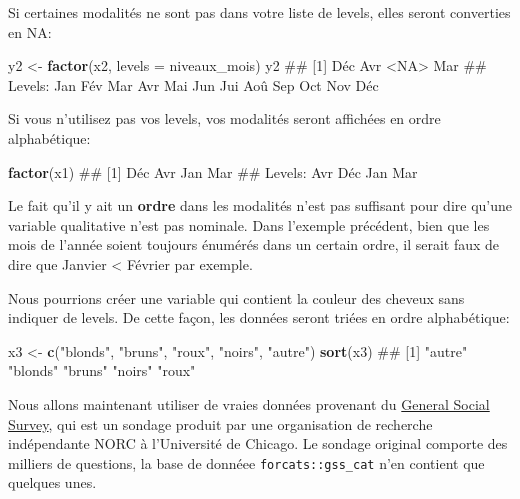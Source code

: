 \documentclass[]{book}
\newenvironment{Shaded}{\begin{snugshade}}{\end{snugshade}}
\newcommand{\DataTypeTok}[1]{\textcolor[rgb]{0.13,0.29,0.53}{#1}}
\newcommand{\KeywordTok}[1]{\textcolor[rgb]{0.13,0.29,0.53}{\textbf{#1}}}
\newcommand{\NormalTok}[1]{#1}
\newcommand{\StringTok}[1]{\textcolor[rgb]{0.31,0.60,0.02}{#1}}
\theoremstyle{definition}
\theoremstyle{definition}
\theoremstyle{definition}
\theoremstyle{remark}
\begin{document}
Si certaines modalités ne sont pas dans votre liste de levels, elles
seront converties en NA:

\begin{Shaded}
\begin{Highlighting}[]
\NormalTok{y2 <-}\StringTok{ }\KeywordTok{factor}\NormalTok{(x2, }\DataTypeTok{levels =}\NormalTok{ niveaux_mois)}
\NormalTok{y2}
\NormalTok{## [1] Déc  Avr  <NA> Mar }
\NormalTok{## Levels: Jan Fév Mar Avr Mai Jun Jui Aoû Sep Oct Nov Déc}
\end{Highlighting}
\end{Shaded}

Si vous n'utilisez pas vos levels, vos modalités seront affichées en
ordre alphabétique:

\begin{Shaded}
\begin{Highlighting}[]
\KeywordTok{factor}\NormalTok{(x1)}
\NormalTok{## [1] Déc Avr Jan Mar}
\NormalTok{## Levels: Avr Déc Jan Mar}
\end{Highlighting}
\end{Shaded}

Le fait qu'il y ait un \textbf{ordre} dans les modalités n'est pas
suffisant pour dire qu'une variable qualitative n'est pas nominale. Dans
l'exemple précédent, bien que les mois de l'année soient toujours
énumérés dans un certain ordre, il serait faux de dire que Janvier
\textless{} Février par exemple.

Nous pourrions créer une variable qui contient la couleur des cheveux
sans indiquer de levels. De cette façon, les données seront triées en
ordre alphabétique:

\begin{Shaded}
\begin{Highlighting}[]
\NormalTok{x3  <-}\StringTok{ }\KeywordTok{c}\NormalTok{(}\StringTok{"blonds"}\NormalTok{, }\StringTok{"bruns"}\NormalTok{, }\StringTok{"roux"}\NormalTok{, }\StringTok{"noirs"}\NormalTok{, }\StringTok{"autre"}\NormalTok{)}
\KeywordTok{sort}\NormalTok{(x3)}
\NormalTok{## [1] "autre"  "blonds" "bruns"  "noirs"  "roux"}
\end{Highlighting}
\end{Shaded}

Nous allons maintenant utiliser de vraies données provenant du
\href{http://gss.norc.org}{General Social Survey}, qui est un sondage
produit par une organisation de recherche indépendante NORC à
l'Université de Chicago. Le sondage original comporte des milliers de
questions, la base de donnéee \texttt{forcats::gss\_cat} n'en contient
que quelques unes.
\end{document}
